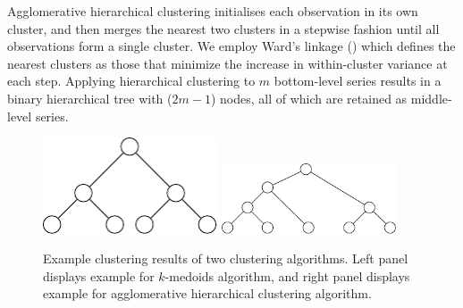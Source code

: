\documentclass[a4paper,review,12pt,authoryear]{elsarticle}
\begin{document}
Agglomerative hierarchical clustering initialises each observation in its own cluster, and then merges the nearest two clusters in a stepwise fashion until all observations form a single cluster. We employ Ward's linkage (\citealp{murtaghWardHierarchicalAgglomerative2014a}) which defines the nearest clusters as those that minimize the increase in within-cluster variance at each step. Applying hierarchical clustering to $m$ bottom-level series results in a binary hierarchical tree with ($2m-1$) nodes, all of which are retained as middle-level series. 

\begin{figure}[h!]
    \centering
    \includegraphics[width=0.46\textwidth]{../manuscript/figures/pamcluster.pdf}
    \hspace{1cm}
    \includegraphics[width=0.46\textwidth]{../manuscript/figures/aggcluster.pdf}
    \caption{\label{fig:cluster_example}Example clustering results of two clustering algorithms. Left panel displays example for $k$-medoids algorithm, and right panel displays example for agglomerative hierarchical clustering algorithm.}
\end{figure}
\end{document}

